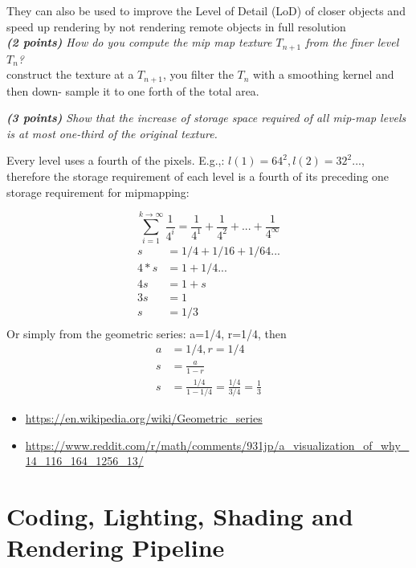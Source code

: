 \documentclass[a4paper,10pt]{article}
\begin{document}
They can also be used to improve the Level of Detail (LoD) of closer objects and speed up rendering
by not rendering remote objects in full resolution\\

\textit{\textbf{(2 points)} How do you compute the mip map texture $T_{n+1}$ from the finer level $T_n$?}\\

construct the texture at a $T_{n+1}$, you filter the $T_n$ with a smoothing kernel and then down- sample it to one forth of the total area.

\textit{\textbf{(3 points)} Show that the increase of storage space required of all mip-map levels is at most one-third of the original texture.}

Every level uses a fourth of the pixels. E.g.,:
$l(1)=64^2,l(2)=32^2...$, therefore the storage requirement of each level is a fourth of its preceding one storage requirement for mipmapping: 

\[\sum_{i=1}^{k\rightarrow\infty}\frac{1}{4^i}=\frac{1}{4^1}+\frac{1}{4^2}+...+\frac{1}{4^\infty}
\]
\[
\begin{aligned}
s&=1/4+1/16+1/64...\\
4*s&=1+1/4...\\
4s&=1+s\\
3s&=1\\
s&=1/3\\
\end{aligned}
\]
Or simply from the geometric series: a=1/4, r=1/4,
then 
\[
\begin{aligned}
a&=1/4, r=1/4\\
s&=\frac{a}{1-r}\\
s&=\frac{1/4}{1-1/4}=\frac{1/4}{3/4}=\frac{1}{3}
\end{aligned}\]

\begin{itemize}
	\item \url{https://en.wikipedia.org/wiki/Geometric_series}
	\item \url{
		https://www.reddit.com/r/math/comments/931jp/a_visualization_of_why_14_116_164_1256_13/}
\end{itemize}
\section{Coding, Lighting, Shading and Rendering Pipeline}
\end{document}
